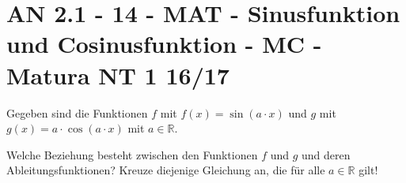 \section{AN 2.1 - 14 - MAT - Sinusfunktion und Cosinusfunktion - MC - Matura NT 1 16/17}

\begin{beispiel}[AN 2.1]{1} %
Gegeben sind die Funktionen $f$ mit $f(x)=\sin(a\cdot x)$ und $g$ mit $g(x)=a\cdot\cos(a\cdot x)$ mit $a\in\mathbb{R}$.

Welche Beziehung besteht zwischen den Funktionen $f$ und $g$ und deren Ableitungsfunktionen? Kreuze diejenige Gleichung an, die für alle $a\in\mathbb{R}$ gilt!

\end{beispiel}